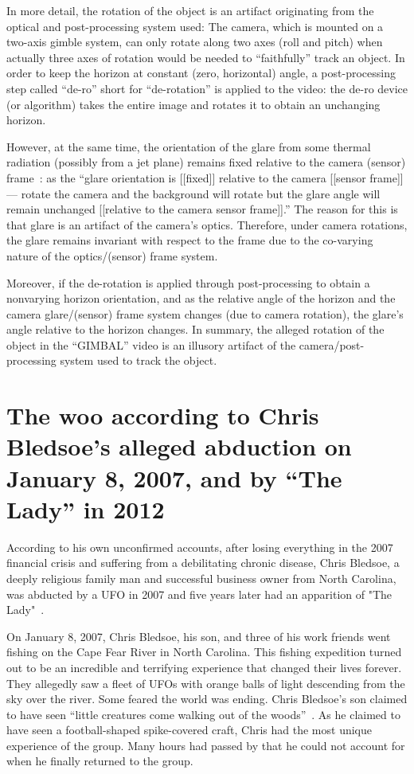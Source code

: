 In more detail, the rotation of the object is an artifact originating from the optical and post-processing system used:
The camera, which is mounted on a two-axis gimble system, can only rotate along two axes (roll and pitch) when actually three axes of rotation would
be needed to ``faithfully'' track an object.
In order to keep the horizon at constant (zero, horizontal) angle, a post-processing step called ``de-ro'' short for ``de-rotation'' is applied to the video:
the de-ro device (or algorithm) takes the entire image and rotates it to obtain an unchanging horizon.

However, at the same time, the orientation of the glare from some thermal radiation (possibly from a jet plane) remains fixed relative to the camera (sensor) frame~\cite[time = 632~s]{West2022Mar}:
as the ``glare orientation is [[fixed]] relative to the camera [[sensor frame]] --- rotate the camera and
the background will rotate but the glare angle will remain unchanged [[relative to the camera sensor frame]].''
The reason for this is that glare is an artifact of the camera's optics.  Therefore, under camera rotations, the glare remains
invariant with respect to the frame due to the co-varying nature of the optics/(sensor) frame system.


Moreover, if the de-rotation is applied through post-processing to obtain a nonvarying horizon orientation,
and as the relative angle of the horizon and the camera glare/(sensor) frame system changes (due to camera rotation), the glare's angle relative to the horizon changes.
In summary, the alleged rotation of the object in the ``GIMBAL'' video is an illusory artifact of the camera/post-processing system used to track the object.



\section{The woo according to Chris Bledsoe's alleged abduction on January 8, 2007, and by ``The Lady'' in 2012}

According to his own unconfirmed accounts, after losing everything in the 2007 financial crisis and suffering from a debilitating chronic disease, Chris Bledsoe, a deeply religious family man and successful business owner from North Carolina, was abducted by a UFO in 2007 and five years later had an apparition of "The Lady"~\cite{BledsoeChris}.

On January 8, 2007, Chris Bledsoe, his son, and three of his work friends went fishing on the Cape Fear River in North Carolina.
This fishing expedition turned out to be an incredible and terrifying experience that changed their lives forever.
They allegedly saw a fleet of UFOs with orange balls of light descending from the sky over the river.
Some feared the world was ending. Chris Bledsoe's son claimed to have seen
``little creatures come walking out of the woods''~\cite[time=699 s]{UOE2008OctS1E1}.
As he claimed to have seen a football-shaped spike-covered craft,
Chris had the most unique experience of the group.
Many hours had passed by that he could not account for when he finally returned to the group.

